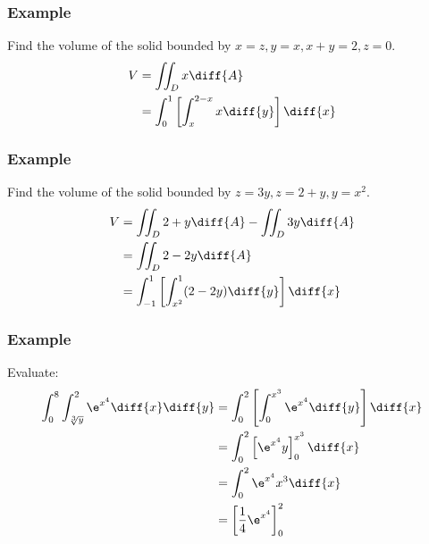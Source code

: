 \documentclass{math}
\begin{document}
\subsubsection*{Example}
Find the volume of the solid bounded by \( x = z, y = x, x+y = 2, z = 0 \).
\begin{align*}
  V &= \iint_{D}x\diff{A} \\
  &= \int_{0}^{1}\left[\int_{x}^{2-x}x\diff{y}\right]\diff{x} \\
\end{align*}

\subsubsection*{Example}
Find the volume of the solid bounded by \( z = 3y, z = 2+y, y = x^2 \).
\begin{align*}
  V &= \iint_{D}2+y\diff{A}-\iint_{D}3y\diff{A} \\
  &= \iint_{D}2-2y\diff{A} \\
  &= \int_{-1}^{1}\left[\int_{x^2}^{1}(2-2y)\diff{y}\right]\diff{x}
\end{align*}

\subsubsection*{Example}
Evaluate:
\begin{align*}
  \int_{0}^{8}\int_{\sqrt[3]{y}}^{2}\e^{x^4}\diff{x}\diff{y} &=
    \int_{0}^{2}\left[\int_{0}^{x^3}\e^{x^4}\diff{y}\right]\diff{x} \\
  &= \int_{0}^{2}\left[\e^{x^4}y\right]_{0}^{x^3}\diff{x} \\
  &= \int_{0}^{2}\e^{x^4}x^3\diff{x} \\
  &= \left[\frac{1}{4}\e^{x^4}\right]_{0}^{2}
\end{align*}
\end{document}
